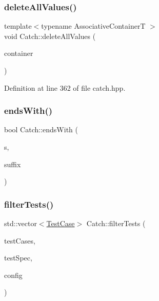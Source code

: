 \hypertarget{namespace_catch_af2fcec1d4bd984fe19ff8b9a432c36a8}{}\label{namespace_catch_af2fcec1d4bd984fe19ff8b9a432c36a8} 
\subsubsection{\texorpdfstring{delete\+All\+Values()}{deleteAllValues()}}
{\footnotesize\ttfamily template$<$typename Associative\+ContainerT $>$ \\
void Catch\+::delete\+All\+Values (\begin{DoxyParamCaption}\item[{Associative\+ContainerT \&}]{container }\end{DoxyParamCaption})\hspace{0.3cm}{\ttfamily [inline]}}



Definition at line 362 of file catch.\+hpp.

\hypertarget{namespace_catch_ada025504f627feaf9ac68ca391515dff}{}\label{namespace_catch_ada025504f627feaf9ac68ca391515dff} 
\subsubsection{\texorpdfstring{ends\+With()}{endsWith()}}
{\footnotesize\ttfamily bool Catch\+::ends\+With (\begin{DoxyParamCaption}\item[{std\+::string const \&}]{s,  }\item[{std\+::string const \&}]{suffix }\end{DoxyParamCaption})}

\hypertarget{namespace_catch_ab5da9aa67c42a3f626aea07d0b556829}{}\label{namespace_catch_ab5da9aa67c42a3f626aea07d0b556829} 
\subsubsection{\texorpdfstring{filter\+Tests()}{filterTests()}}
{\footnotesize\ttfamily std\+::vector$<$\hyperlink{class_catch_1_1_test_case}{Test\+Case}$>$ Catch\+::filter\+Tests (\begin{DoxyParamCaption}\item[{std\+::vector$<$ \hyperlink{class_catch_1_1_test_case}{Test\+Case} $>$ const \&}]{test\+Cases,  }\item[{Test\+Spec const \&}]{test\+Spec,  }\item[{I\+Config const \&}]{config }\end{DoxyParamCaption})}

